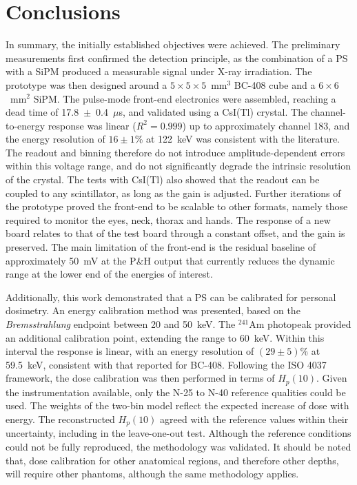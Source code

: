 \chapter{Conclusions}
In summary, the initially established objectives were achieved. The preliminary measurements first confirmed the detection principle, as the combination of a PS with a SiPM produced a measurable signal under X-ray irradiation. The prototype was then designed around a $5 \times 5 \times 5$~mm$^3$ BC-408 cube and a $6 \times 6$~mm$^2$ SiPM. The pulse-mode front-end electronics were assembled, reaching a dead time of 17.8~$\pm$~0.4~$\mu$s, and validated using a CsI(Tl) crystal. The channel-to-energy response was linear ($R^2 = 0.999$) up to approximately channel 183, and the energy resolution of $16 \pm 1$\% at 122~keV was consistent with the literature. The readout and binning therefore do not introduce amplitude-dependent errors within this voltage range, and do not significantly degrade the intrinsic resolution of the crystal. The tests with CsI(Tl) also showed that the readout can be coupled to any scintillator, as long as the gain is adjusted. Further iterations of the prototype proved the front-end to be scalable to other formats, namely those required to monitor the eyes, neck, thorax and hands. The response of a new board relates to that of the test board through a constant offset, and the gain is preserved. The main limitation of the front-end is the residual baseline of approximately 50~mV at the P\&H output that currently reduces the dynamic range at the lower end of the energies of interest.

Additionally, this work demonstrated that a PS can be calibrated for personal dosimetry. An energy calibration method was presented, based on the \emph{Bremsstrahlung} endpoint between 20 and 50~keV. The $^{241}$Am photopeak provided an additional calibration point, extending the range to 60~keV. Within this interval the response is linear, with an energy resolution of $(29 \pm 5)$\% at 59.5~keV, consistent with that reported for BC-408. Following the ISO 4037 framework, the dose calibration was then performed in terms of $H_p(10)$. Given the instrumentation available, only the N-25 to N-40 reference qualities could be used. The weights of the two-bin model reflect the expected increase of dose with energy. The reconstructed ${H}_p(10)$ agreed with the reference values within their uncertainty, including in the leave-one-out test. Although the reference conditions could not be fully reproduced, the methodology was validated. It should be noted that, dose calibration for other anatomical regions, and therefore other depths, will require other phantoms, although the same methodology applies.

